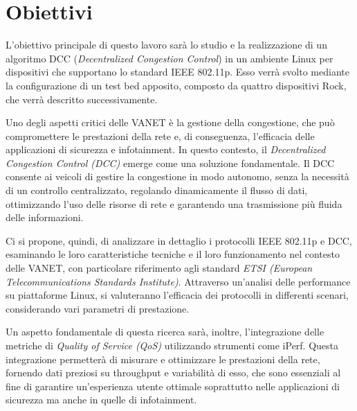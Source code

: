 \section{Obiettivi}
L'obiettivo principale di questo lavoro sarà lo studio e la realizzazione di un algoritmo DCC (\textit{Decentralized Congestion Control}) in un ambiente Linux per dispositivi che supportano lo standard IEEE 802.11p. Esso verrà svolto mediante la configurazione di un test bed apposito, composto da quattro dispositivi Rock, che verrà descritto successivamente.

Uno degli aspetti critici delle VANET è la gestione della congestione, che può compromettere le prestazioni della rete e, di conseguenza, l'efficacia delle applicazioni di sicurezza e infotainment. In questo contesto, il \textit{Decentralized Congestion Control (DCC)} emerge come una soluzione fondamentale. Il DCC consente ai veicoli di gestire la congestione in modo autonomo, senza la necessità di un controllo centralizzato, regolando dinamicamente il flusso di dati, ottimizzando l'uso delle risorse di rete e garantendo una trasmissione più fluida delle informazioni.

Ci si propone, quindi, di analizzare in dettaglio i protocolli IEEE 802.11p e DCC, esaminando le loro caratteristiche tecniche e il loro funzionamento nel contesto delle VANET, con particolare riferimento agli standard \textit{ETSI (European Telecommunications Standards Institute)}. Attraverso un'analisi delle performance su piattaforme Linux, si valuteranno l'efficacia dei protocolli in differenti scenari, considerando vari parametri di prestazione.

Un aspetto fondamentale di questa ricerca sarà, inoltre, l'integrazione delle metriche di \textit{Quality of Service (QoS)} utilizzando strumenti come iPerf. Questa integrazione permetterà di misurare e ottimizzare le prestazioni della rete, fornendo dati preziosi su throughput e variabilità di esso, che sono essenziali al fine di garantire un'esperienza utente ottimale soprattutto nelle applicazioni di sicurezza ma anche in quelle di infotainment.